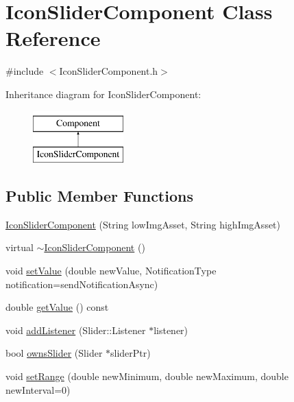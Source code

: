 \hypertarget{classIconSliderComponent}{}\section{Icon\+Slider\+Component Class Reference}
\label{classIconSliderComponent}


{\ttfamily \#include $<$Icon\+Slider\+Component.\+h$>$}

Inheritance diagram for Icon\+Slider\+Component\+:\begin{figure}[H]
\begin{center}
\leavevmode
\includegraphics[height=2.000000cm]{classIconSliderComponent}
\end{center}
\end{figure}
\subsection*{Public Member Functions}
\begin{DoxyCompactItemize}
\item 
\mbox{\hyperlink{classIconSliderComponent_a09673cf0d38e4d7d03f27ba2c539984e}{Icon\+Slider\+Component}} (String low\+Img\+Asset, String high\+Img\+Asset)
\item 
virtual \mbox{\hyperlink{classIconSliderComponent_a10748ba0866a0ff945b48543f2952272}{$\sim$\+Icon\+Slider\+Component}} ()
\item 
void \mbox{\hyperlink{classIconSliderComponent_afc405e294b4b83b8ae60695d5e2d76f8}{set\+Value}} (double new\+Value, Notification\+Type notification=send\+Notification\+Async)
\item 
double \mbox{\hyperlink{classIconSliderComponent_a755a7a4ebd11f09186a80932339846d9}{get\+Value}} () const
\item 
void \mbox{\hyperlink{classIconSliderComponent_ab00c8bce56d11493fcb2e8b8b6e10fdc}{add\+Listener}} (Slider\+::\+Listener $\ast$listener)
\item 
bool \mbox{\hyperlink{classIconSliderComponent_a324baf259469f2d08069b2f26c61f3d1}{owns\+Slider}} (Slider $\ast$slider\+Ptr)
\item 
void \mbox{\hyperlink{classIconSliderComponent_ab4025c08213a77c87e16d32807326dda}{set\+Range}} (double new\+Minimum, double new\+Maximum, double new\+Interval=0)
\end{DoxyCompactItemize}


